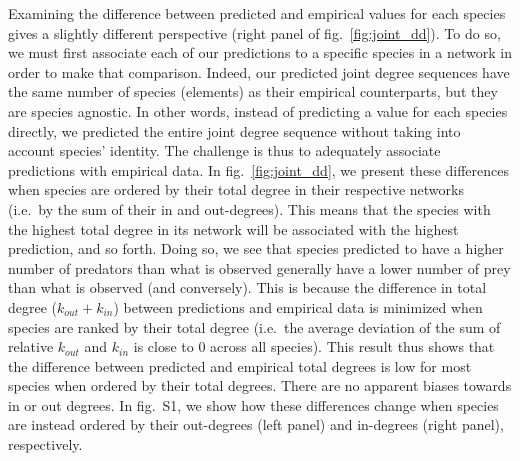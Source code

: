 \documentclass[11pt]{article}
\begin{document}
Examining the difference between predicted and empirical values for each
species gives a slightly different perspective (right panel of
fig.~\ref{fig:joint_dd}). To do so, we must first associate each of our
predictions to a specific species in a network in order to make that
comparison. Indeed, our predicted joint degree sequences have the same
number of species (elements) as their empirical counterparts, but they
are species agnostic. In other words, instead of predicting a value for
each species directly, we predicted the entire joint degree sequence
without taking into account species' identity. The challenge is thus to
adequately associate predictions with empirical data. In
fig.~\ref{fig:joint_dd}, we present these differences when species are
ordered by their total degree in their respective networks (i.e.~by the
sum of their in and out-degrees). This means that the species with the
highest total degree in its network will be associated with the highest
prediction, and so forth. Doing so, we see that species predicted to
have a higher number of predators than what is observed generally have a
lower number of prey than what is observed (and conversely). This is
because the difference in total degree (\(k_{out} + k_{in}\)) between
predictions and empirical data is minimized when species are ranked by
their total degree (i.e.~the average deviation of the sum of relative
\(k_{out}\) and \(k_{in}\) is close to \(0\) across all species). This
result thus shows that the difference between predicted and empirical
total degrees is low for most species when ordered by their total
degrees. There are no apparent biases towards in or out degrees. In
fig.~S1, we show how these differences change when species are instead
ordered by their out-degrees (left panel) and in-degrees (right panel),
respectively.
\end{document}

